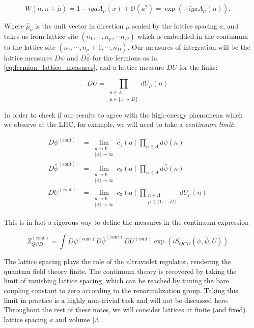 \documentclass[11pt]{article}
\begin{document}
\begin{equation}W(n,n+\hat\mu)=1-igaA_\mu(x)+\mathcal O(a^2)=\exp(-i g aA_\mu(n)).\end{equation}

Where $\hat\mu_\nu$ is the unit vector in direction $\mu$ scaled by the lattice spacing $a$, and takes us from lattice site $(n_1,\cdots,n_\mu,\cdots n_D)$ which is embedded in the continuum to the lattice site $(n_1,\cdots,n_\mu+1,\cdots,n_D)$. Our measures of integration will be the lattice measures $D\psi$ and $D\bar\psi$ for the fermions as in \eqref{eq:fermion_lattice_measures}, and a lattice measure $DU$ for the links:

\begin{equation}DU=\prod_{\substack{n\in\Lambda\\\mu\in\{1,\cdots,D\}}} dU_\mu(n)\end{equation}

In order to check if our results to agree with the high-energy phenomena which we observe at the LHC, for example, we will need to take a \textit{continuum limit}:

\begin{align*}
D\psi^{(\mathrm{cont})}&=\lim_{\substack{a\to 0\\|\Lambda|\to\infty}}c_1(a)\prod_{n\in\Lambda} d\psi(n)\\
D\bar\psi^{(\mathrm{cont})}&=\lim_{\substack{a\to 0\\|\Lambda|\to\infty}}c_2(a)\prod_{n\in\Lambda} d\bar\psi(n)\\
DU^{(\mathrm{cont})}&=\lim_{\substack{a\to 0\\|\Lambda|\to\infty}}c_3(a)\prod_{\substack{n\in\Lambda\\\mu\in\{1,\cdots,D\}}} dU_\mu(n)
\end{align*}

This is in fact a rigorous way to define the measures in the continuum expression

\begin{equation}Z_{QCD}^{(\mathrm{cont})}=\int D\psi^{(\mathrm{cont})} D\bar\psi^{(\mathrm{cont})} DU^{(\mathrm{cont})}\exp(iS_{QCD}(\psi,\bar\psi,U))\end{equation}

The lattice spacing plays the role of the ultraviolet regulator, rendering the quantum field theory finite. The continuum theory is recovered by taking the limit of vanishing lattice spacing, which can be reached by tuning the bare coupling constant to zero according to the renormalization group. Taking this limit in practice is a highly non-trivial task and will not be discussed here. Throughout the rest of these notes, we will consider lattices at finite (and fixed) lattice spacing $a$ and volume $|\Lambda|$.
\end{document}
